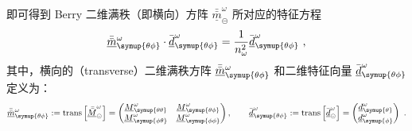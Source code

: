 即可得到 Berry 二维满秩（即横向）方阵 $\bar{\bar{\underline{m}}}^{\omega}_{\circleddash}$ 所对应的特征方程
\begin{equation} \label{eq:2-53}
	\bar{\bar{\underline{m}}}^{\omega}_{\symup{\theta\phi}} \cdot \bar{\underline{d}}^{\omega}_{\symup{\theta\phi}} = \frac{ 1 }{ n^2_\omega } \bar{\underline{d}}^{\omega}_{\symup{\theta\phi}} ~,
\end{equation}
其中，横向的（transverse）二维满秩方阵 $\bar{\bar{\underline{m}}}^{\omega}_{\symup{\theta\phi}}$ 和二维特征向量 $\bar{\underline{d}}^{\omega}_{\symup{\theta\phi}}$ 定义为：
\begin{equation} \label{eq:2-54}
	\bar{\bar{\underline{m}}}^{\omega}_{\symup{\theta\phi}} := \text{trans} \left[ \underline{\bar{\bar{M}}}^{\omega}_{\circleddash} \right] = \begin{pmatrix} \underline{M}^{\omega}_{\symup{\theta\theta}} & \underline{M}^{\omega}_{\symup{\theta\phi}} \\ \underline{M}^{\omega}_{\symup{\phi\theta}} & \underline{M}^{\omega}_{\symup{\phi\phi}} \end{pmatrix},\ \ \ \ \ \  \bar{\underline{d}}^{\omega}_{\symup{\theta\phi}} := \text{trans} \left[ \bar{\underline{d}}^{\omega}_{\circleddash} \right] = \begin{pmatrix} \underline{d}^{\omega}_{\symup{\theta}} \\ \underline{d}^{\omega}_{\symup{\phi}} \end{pmatrix} ~.
\end{equation}

